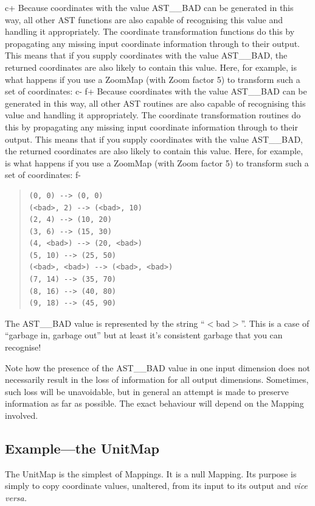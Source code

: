 \documentclass[twoside,11pt]{article}
\begin{document}
c+
Because coordinates with the value AST\_\_BAD can be generated in this
way, all other AST functions are also capable of recognising this
value and handling it appropriately. The coordinate transformation
functions do this by propagating any missing input coordinate
information through to their output.  This means that if you supply
coordinates with the value AST\_\_BAD, the returned coordinates are
also likely to contain this value. Here, for example, is what happens
if you use a ZoomMap (with Zoom factor 5) to transform such a set of
coordinates:
c-
f+
Because coordinates with the value AST\_\_BAD can be generated in this
way, all other AST routines are also capable of recognising this value
and handling it appropriately. The coordinate transformation routines
do this by propagating any missing input coordinate information
through to their output.  This means that if you supply coordinates
with the value AST\_\_BAD, the returned coordinates are also likely to
contain this value. Here, for example, is what happens if you use a
ZoomMap (with Zoom factor 5) to transform such a set of coordinates:
f-

\begin{quote}
\small
\begin{verbatim}
(0, 0) --> (0, 0)
(<bad>, 2) --> (<bad>, 10)
(2, 4) --> (10, 20)
(3, 6) --> (15, 30)
(4, <bad>) --> (20, <bad>)
(5, 10) --> (25, 50)
(<bad>, <bad>) --> (<bad>, <bad>)
(7, 14) --> (35, 70)
(8, 16) --> (40, 80)
(9, 18) --> (45, 90)
\end{verbatim}
\normalsize
\end{quote}

The AST\_\_BAD value is represented by the string ``$<$bad$>$''. This
is a case of ``garbage in, garbage out'' but at least it's consistent
garbage that you can recognise!

Note how the presence of the AST\_\_BAD value in one input dimension
does not necessarily result in the loss of information for all output
dimensions. Sometimes, such loss will be unavoidable, but in general
an attempt is made to preserve information as far as possible. The
exact behaviour will depend on the Mapping involved.

\subsection{\label{ss:unitmapexample}Example---the UnitMap}

The UnitMap is the simplest of Mappings. It is a null Mapping. Its
purpose is simply to copy coordinate values, unaltered, from its input
to its output and {\em{vice versa.}}
\end{document}

